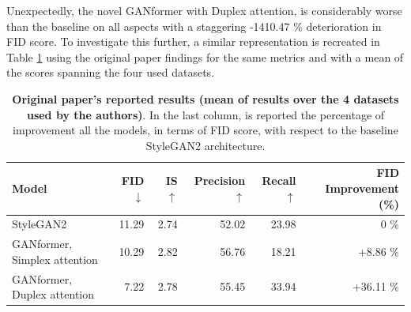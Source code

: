 \documentclass{article}
\begin{document}
	Unexpectedly, the novel GANformer with Duplex attention, is considerably worse than the baseline 
	on all aspects with a staggering -1410.47 \% deterioration in FID score.
	To investigate this further, a similar representation is recreated in Table \ref{tab:orig-results} using 
	the original paper findings for the same metrics and with a mean of the scores spanning the four 
	used datasets.
	\begin{table}[htb]
		\centering
		\caption{\textbf{Original paper's reported results (mean of results over the 4 datasets used by the 
				authors)}. In the last column, is reported the percentage of improvement all the models, in 
				terms 
			of FID score, with respect to the baseline StyleGAN2 architecture.}
		\label{tab:orig-results}
		\vspace{3mm}
		\small
		\begin{tabular}{l|rrrrr}
			\toprule
			Model           & FID  $\downarrow$ & IS $\uparrow$& Precision $\uparrow$ & Recall 
			$\uparrow$& {FID Improvement (\%)}\\ 
			\midrule
			StyleGAN2                    & 11.29 & 2.74 & 52.02      & 23.98 & 0 \% \\ 
			{GANformer, Simplex attention} & 10.29 & 2.82   & 56.76     & 18.21  & 
			+8.86 \% \\ 
			{GANformer, Duplex attention}  & 7.22   & 2.78 & 55.45     & 33.94 & +36.11 \%
			\\ 
			\bottomrule
		\end{tabular}
	\end{table}
	
\end{document}
